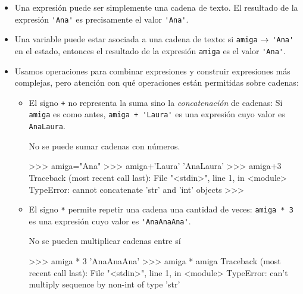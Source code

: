 \begin{itemize}
\item Una expresión puede ser simplemente una cadena de texto.  El resultado de
    la expresión \lstinline!'Ana'! es precisamente el valor \lstinline!'Ana'!.

\item Una variable puede estar asociada a una cadena de texto: si
    \lstinline!amiga! $\rightarrow$ \lstinline!'Ana'! en el estado, entonces el
    resultado de la expresión \lstinline!amiga! es el valor \lstinline!'Ana'!.

\item Usamos operaciones para combinar expresiones y construir
expresiones más complejas, pero atención con qué operaciones están
permitidas sobre cadenas:

\begin{itemize}
    \item El signo \lstinline!+! no representa la suma sino la {\it
        concatenación} de cadenas: Si \lstinline!amiga! es como antes,
        \lstinline!amiga + 'Laura'!  es una expresión cuyo valor es
        \lstinline!AnaLaura!.

\begin{atencion}
No se puede sumar cadenas con números.
\begin{codigo-python-sn}
>>> amiga="Ana"
>>> amiga+'Laura'
'AnaLaura'
>>> amiga+3
Traceback (most recent call last):
  File "<stdin>", line 1, in <module>
TypeError: cannot concatenate 'str' and 'int' objects
>>>
\end{codigo-python-sn}
\end{atencion}

\item El signo \lstinline!*! permite repetir una cadena una cantidad de veces:
    \lstinline!amiga * 3! es una expresión cuyo valor es
    \lstinline!'AnaAnaAna'!.

\begin{atencion}
No se pueden multiplicar cadenas entre sí

\begin{codigo-python-sn}
>>> amiga * 3
'AnaAnaAna'
>>> amiga * amiga
Traceback (most recent call last):
  File "<stdin>", line 1, in <module>
TypeError: can't multiply sequence by non-int of type 'str'
\end{codigo-python-sn}
\end{atencion}

\end{itemize}

\end{itemize}

